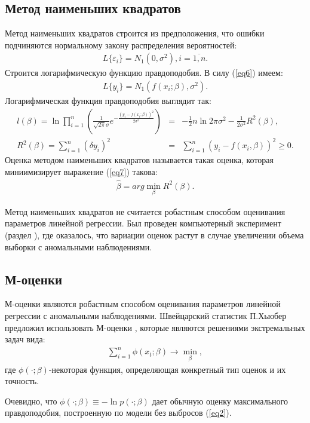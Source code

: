 \subsection{Метод наименьших квадратов}
Метод наименьших квадратов строится из предположения, что ошибки подчиняются нормальному закону распределения вероятностей:
\begin{eqnarray}
    \label{eq5}L\{\varepsilon_i\}=N_1(0,\sigma^2), i = \overline{1,n}.
\end{eqnarray}
Строится логарифмическую функцию правдоподобия. В силу (\ref{eq6}) имеем:
\begin{eqnarray}
    L\{y_i\}=N_1(f(x_i;\beta), \sigma^2).
\end{eqnarray}
Логарифмическая функция правдоподобия выглядит так\cite{Kharin}:
\begin{eqnarray}
    l(\beta)=\ln \prod_{i=1}^{n}(\frac{1}{\sqrt{2\pi}\sigma}e^{-\frac{(y_i-f(x_i;\beta))^2}{2\sigma^2}})&=&-\frac{1}{2}n\ln{2\pi\sigma^2}-\frac{1}{2\sigma^2}R^2(\beta),\\
    \label{eq7}R^2(\beta)=\sum_{i=1}^{n}(\delta y_i)^2&=&\sum_{i=1}^{n}(y_i-f(x_i,\beta))^2\geq 0.
\end{eqnarray}
Оценка методом наименьших квадратов называется такая оценка, которая миниимизирует  выражение (\ref{eq7}) такова:
\begin{eqnarray}
    \hat{\beta}=arg \min_{\beta}R^2(\beta).
\end{eqnarray}

Метод наименьших квадратов не считается робастным способом оценивания параметров линейной регрессии. Был проведен компьютерный эксперимент (раздел ), где оказалось, что вариации оценок растут в случае увеличении объема выборки с аномальными наблюдениями.

\subsection{М-оценки}
М-оценки являются робастным способом оценивания параметров линейной регрессии с аномальными наблюдениями.
Швейцарский статистик П.Хьюбер предложил использовать М-оценки \cite{Kharin}, которые являются решениями экстремальных задач вида:
\begin{eqnarray}
    \sum_{i=1}^{n}\phi(x_t;\beta)\rightarrow \min_{\beta},
\end{eqnarray}
где $\phi(\cdot;\beta)$-некоторая функция, определяющая конкретный тип оценок и их точность.

Очевидно, что $\phi(\cdot;\beta)\equiv - \ln{p(\cdot;\beta)}$ дает обычную оценку максимального правдоподобия, построенную по модели без выбросов (\ref{eq2}).

